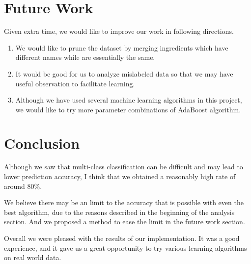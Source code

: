 \documentclass[11pt]{article}
\begin{document}






\section{Future Work}
Given extra time, we would like to improve our work in following directions.
\begin{enumerate}
	\item We would like to prune the dataset by merging ingredients which have different names while are essentially the same. 
	\item It would be good for us to analyze mislabeled data so that we may have useful observation to facilitate learning.
	\item Although we have used several machine learning algorithms in this project, we would like to try more parameter combinations of AdaBoost algorithm.
\end{enumerate}

\section{Conclusion}
Although we saw that multi-class classification can be difficult and
may lead to lower prediction accuracy, I think that we obtained a
reasonably high rate of around 80\%.  

We believe there may be an limit to the accuracy that is possible with
even the best algorithm, due to the reasons described in the beginning of the analysis section. And we proposed a method to ease the limit in the future work section.


Overall we were pleased with the results of our implementation.  It
was a good experience, and it gave us a great opportunity to try
various learning algorithms on real world data.



\end{document}
